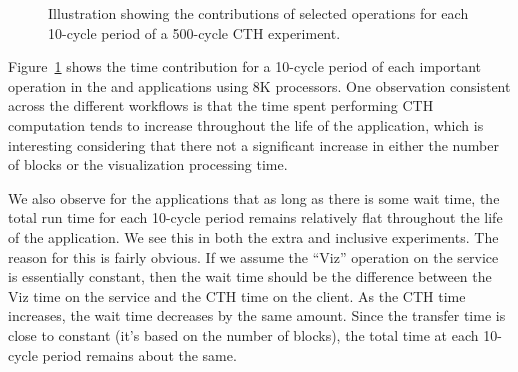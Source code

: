 
\begin{figure}[bp]
\begin{centering}
\vspace{-24pt}

\vspace{-12pt}


\caption[Time-series plots of experiments.]{Illustration showing the
contributions of selected operations for each 10-cycle period of a 500-cycle
CTH experiment.
}
\label{fig:time-series}
\end{centering}
\end{figure}


Figure~\ref{fig:time-series} shows
the time contribution for a 10-cycle period of each important operation in the
\insitu and \intransit applications using 8K processors.  One observation
consistent across the different workflows is that the time spent performing
CTH computation tends to increase throughout the life of the application,
which is interesting considering that there not a significant increase in
either the number of blocks or the visualization processing time.

We also observe for the \intransit applications that as long as there is some
wait time, the total run time for each 10-cycle period remains relatively flat
throughout the life of the application.  We see this in both the \intransit
extra and \intransit inclusive experiments.  The reason for this is fairly
obvious.  If we assume the ``Viz'' operation on the service is essentially
constant, then the wait time should be the difference between the Viz time on
the service and the CTH time on the client.  As the CTH time increases, the
wait time decreases by the same amount.  Since the transfer time is close to
constant (it's based on the number of blocks), the total time at each 10-cycle
period remains about the same.


\FloatBarrier

